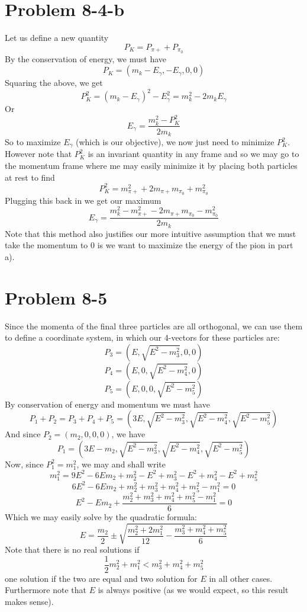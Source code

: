 \section*{Problem 8-4-b}
Let us define a new quantity 
\[ P_K = P_{\pi+} + P_{\pi_0} \]
By the conservation of energy, we must have
\[ P_K = (m_k-E_\gamma,-E_\gamma,0,0) \]
Squaring the above, we get 
\[ P_K^2 = (m_k-E_\gamma)^2 - E_\gamma^2 = m_k^2 -  2m_kE_\gamma \]
Or 
\[ E_\gamma = \frac{m_k^2-P_K^2}{2m_k} \]
So to maximize $E_\gamma$ (which is our objective), we now just need to minimize $P_K^2$. However note that $P_K^2$ is an invariant quantity in any frame and so we may go to the momentum frame where me may easily minimize it by placing both particles at rest to find 
\[ P_K^2 = m_{\pi+}^2 + 2 m_{\pi+} m_{\pi_0} + m_{\pi_0}^2 \]
Plugging this back in we get our maximum
\[ E_\gamma = \frac{m_k^2-m_{\pi+}^2 - 2 m_{\pi+} m_{\pi_0} - m_{\pi_0}^2 }{2m_k} \]
Note that this method also justifies our more intuitive assumption that we must take the momentum to $0$ is we want to maximize the energy of the pion in part a).
\section*{Problem 8-5}
Since the momenta of the final three particles are all orthogonal, we can use them to define a coordinate system, in which our 4-vectors for these particles are:
\[ P_3 = (E,\sqrt{E^2-m_3^2},0,0) \]
\[ P_4 = (E,0,\sqrt{E^2-m_4^2},0) \]
\[ P_5 = (E,0,0,\sqrt{E^2-m_5^2}) \]
By conservation of energy and momentum we must have
\[ P_1+P_2 = P_3+P_4+P_5 = (3E,\sqrt{E^2-m_3^2},\sqrt{E^2-m_4^2},\sqrt{E^2-m_5^2}) \]
And  since $P_2 = (m_2,0,0,0)$, we have
\[ P_1 = (3E-m_2,\sqrt{E^2-m_3^2},\sqrt{E^2-m_4^2},\sqrt{E^2-m_5^2}) \]
Now, since $P_1^2 = m_1^2$, we may and shall write
\[ m_1^2 = 9E^2-6Em_2 + m_2^2 - E^2+m_3^2- E^2+m_4^2-E^2+m_5^2 \]
\[ 6E^2 - 6Em_2 + m_2^2 + m_3^2 + m_4^2 + m_5^2 - m_1^2 = 0 \]
\[ E^2-Em_2 + \frac{m_2^2 + m_3^2 + m_4^2 + m_5^2 - m_1^2}{6} = 0 \]
Which we may easily solve by the quadratic formula:
\[ \boxed{ E = \frac{m_2}{2} \pm \sqrt{\frac{m_2^2+2m_1^2}{12} - \frac{m_3^2 + m_4^2 + m_5^2}{6}} } \]
Note that there is no real solutions if 
\[ \frac{1}{2}m_2^2+m_1^2 < m_3^2 + m_4^2 + m_5^2 \]
one solution if the two are equal and two solution for $E$ in all other cases. Furthermore note that $E$ is always positive (as we would expect, so this result makes sense). 

